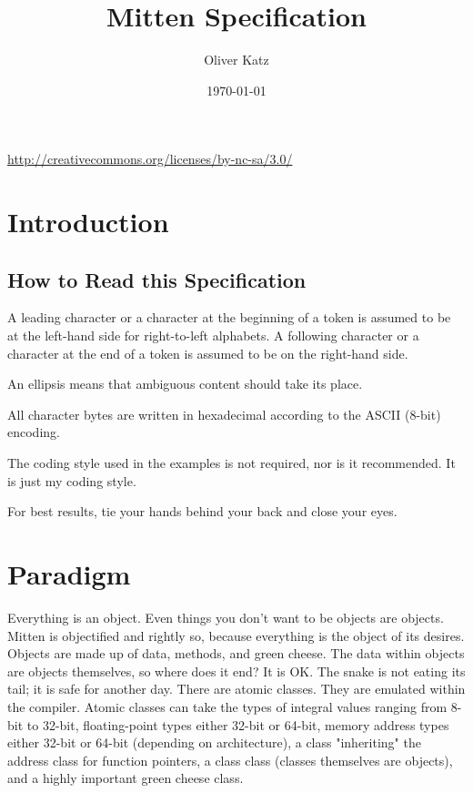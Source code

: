 \documentclass[10pt,a4paper]{article}
\author{Oliver Katz}
\title{Mitten Specification}
\date{\today}
\begin{document}
\maketitle
\begin{center}
\ccbyncsa \linebreak
\url{http://creativecommons.org/licenses/by-nc-sa/3.0/}
\end{center}
\tableofcontents

\section{Introduction}
\subsection{How to Read this Specification}
A leading character or a character at the beginning of a token is assumed to be at the left-hand side for right-to-left alphabets. A following character or a character at the end of a token is assumed to be on the right-hand side. 

An ellipsis means that ambiguous content should take its place.

All character bytes are written in hexadecimal according to the ASCII (8-bit) encoding. 

The coding style used in the examples is not required, nor is it recommended. It is just my coding style.

For best results, tie your hands behind your back and close your eyes.

\section{Paradigm}
Everything is an object. Even things you don't want to be objects are objects. Mitten is objectified and rightly so, because everything is the object of its desires. Objects are made up of data, methods, and green cheese. The data within objects are objects themselves, so where does it end? It is OK. The snake is not eating its tail; it is safe for another day. There are atomic classes. They are emulated within the compiler. Atomic classes can take the types of integral values ranging from 8-bit to 32-bit, floating-point types either 32-bit or 64-bit, memory address types either 32-bit or 64-bit (depending on architecture), a class "inheriting" the address class for function pointers, a class class (classes themselves are objects), and a highly important green cheese class.
\end{document}
